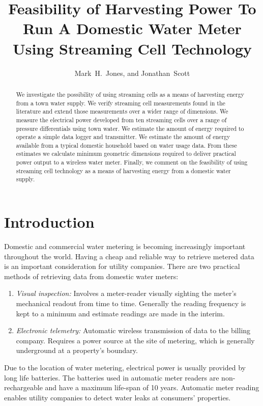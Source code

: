\documentclass[10pt,final,journal]{IEEEtran}
\title{Feasibility of Harvesting Power To Run A Domestic Water Meter Using Streaming Cell Technology}
\author{Mark~H.~Jones, and Jonathan~Scott}
\begin{document}
    \maketitle

    \begin{abstract}
        We investigate the possibility of using streaming cells as a means of harvesting energy from a town water supply.
        We verify streaming cell measurements found in the literature and extend those measurements over a wider range of dimensions.
        We measure the electrical power developed from ten streaming cells over a range of pressure differentials using town water.
        We estimate the amount of energy required to operate a simple data logger and transmitter.
        We estimate the amount of energy available from a typical domestic household based on water usage data.
        From these estimates we calculate minimum geometric dimensions required to deliver practical power output to a wireless water meter.
        Finally, we comment on the feasibility of using streaming cell technology as a means of harvesting energy from a domestic water supply.
    \end{abstract}

    \section{Introduction}
    Domestic and commercial water metering is becoming increasingly important throughout the world.
    Having a cheap and reliable way to retrieve metered data is an important consideration for utility companies.
    There are two practical methods of retrieving data from domestic water meters:
    \begin{enumerate}
        \item \emph{Visual inspection:}
            Involves a meter-reader visually sighting the meter's mechanical readout from time to time.
            Generally the reading frequency is kept to a minimum and estimate readings are made in the interim.
        \item \emph{Electronic telemetry:}
            Automatic wireless transmission of data to the billing company.
            Requires a power source at the site of metering, which is generally underground at a property's boundary.
        \end{enumerate}
    Due to the location of water metering, electrical power is usually provided by long life batteries.
    The batteries used in automatic meter readers are non-rechargeable and have a maximum life-span of 10 years.\cite{BMeters2014}
    Automatic meter reading enables utility companies to detect water leaks at consumers' properties.~\cite{Britton2013}
\end{document}
